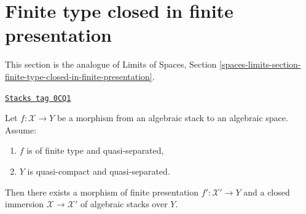 \section{Finite type closed in finite presentation}
\label{stacks-limits-section-finite-type-closed-in-finite-presentation}
This section is the analogue of
Limits of Spaces, Section
\ref{spaces-limits-section-finite-type-closed-in-finite-presentation}.

\begin{lemma}
\label{stacks-limits-lemma-finite-type-closed-in-finite-presentation}
\href{https://stacks.math.columbia.edu/tag/0CQ1}{\texttt{Stacks tag 0CQ1}}

Let $f : \mathcal{X} \to Y$ be a morphism from an algebraic stack
to an algebraic space. Assume:
\begin{enumerate}
\item $f$ is of finite type and quasi-separated,
\item $Y$ is quasi-compact and quasi-separated.
\end{enumerate}
Then there exists a morphism of finite presentation
$f' : \mathcal{X}' \to Y$ and a closed immersion
$\mathcal{X} \to \mathcal{X}'$ of
algebraic stacks over $Y$.
\end{lemma}

